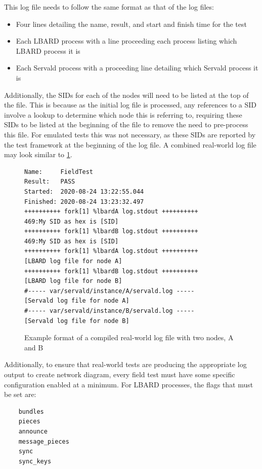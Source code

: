 This log file needs to follow the same format as that of the log files:
\begin{itemize}
    \item Four lines detailing the name, result, and start and finish time for the test
    \item Each LBARD process with a line proceeding each process listing which LBARD process it is
    \item Each Servald process with a proceeding line detailing which Servald process it is
\end{itemize} 

Additionally, the SIDs for each of the nodes will need to be listed at the top of the file. 
This is because as the initial log file is processed, any references to a SID involve a lookup to determine which node this is referring to, requiring these SIDs to be listed at the beginning of the file to remove the need to pre-process this file.
For emulated tests this was not necessary, as these SIDs are reported by the test framework at the beginning of the log file.
A combined real-world log file may look similar to \figurename{ \ref{fig:chapter6RealWorldLog}}.

\begin{figure}
    \begin{centering}
\begin{lstlisting}[basicstyle=\small, breaklines, frame=single]
Name:     FieldTest
Result:   PASS
Started:  2020-08-24 13:22:55.044
Finished: 2020-08-24 13:23:32.497
++++++++++ fork[1] %lbardA log.stdout ++++++++++
469:My SID as hex is [SID]
++++++++++ fork[1] %lbardB log.stdout ++++++++++
469:My SID as hex is [SID]
++++++++++ fork[1] %lbardA log.stdout ++++++++++
[LBARD log file for node A]
++++++++++ fork[1] %lbardB log.stdout ++++++++++
[LBARD log file for node B]
#----- var/servald/instance/A/servald.log -----
[Servald log file for node A]
#----- var/servald/instance/B/servald.log -----
[Servald log file for node B]
\end{lstlisting}
        \caption{Example format of a compiled real-world log file with two nodes, A and B}
        \label{fig:chapter6RealWorldLog}
    \end{centering}
\end{figure}

Additionally, to ensure that real-world tests are producing the appropriate log output to create network diagram, every field test must have some specific configuration enabled at a minimum.
For LBARD processes, the flags that must be set are:
\begin{lstlisting}
    bundles
    pieces
    announce
    message_pieces
    sync
    sync_keys
    \end{lstlisting}

